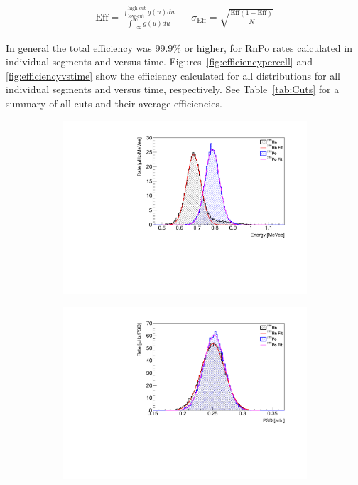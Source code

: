 \begin{align}
	\text{Eff} = \frac{\int_{\text{low-cut}}^{\text{high-cut}}g(u) du}{\int_{-\infty}^{\infty}g(u) du}
	&& \sigma_{\text{Eff}} =\sqrt{\frac{\text{Eff}(1-\text{Eff})}{N}}
	\label{eq:Eff}
\end{align}	

In general the total efficiency was 99.9\% or higher, for RnPo rates calculated in individual segments and versus time.
Figures~\ref{fig:efficiencypercell} and \ref{fig:efficiencyvstime} show the efficiency calculated for all distributions for all individual segments and versus time, respectively.
See Table~\ref{tab:Cuts} for a summary of all cuts and their average efficiencies.

\begin{figure}[H]
	\begin{subfigure}{0.5\linewidth}
	\centering
	\includegraphics[width=0.95\linewidth]{tex/6-ac227-images/AD_RateCalc/RnPoEn_Seg76}
	\caption{}
	\label{fig:rnpoenseg76}
\end{subfigure}%
\begin{subfigure}{0.5\linewidth}
	\centering
	\includegraphics[width=0.95\linewidth]{tex/6-ac227-images/AD_RateCalc/RnPoPSD_Seg76}

\end{subfigure}
\end{figure}
